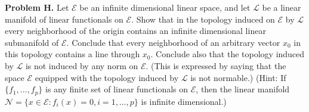 \textbf{Problem H.} Let $\mathcal{E}$ be an infinite dimensional linear space, and let $\mathcal{L}$ be a linear manifold of linear functionals on $\mathcal{E}$. Show that in the topology induced on $\mathcal{E}$ by $\mathcal{L}$ every neighborhood of the origin contains an infinite dimensional linear submanifold of $\mathcal{E}$. Conclude that every neighborhood of an arbitrary vector $x_0$ in this topology contains a line through $x_0$. Conclude also that the topology induced by $\mathcal{L}$ is not induced by any norm on $\mathcal{E}$. (This is expressed by saying that the space $\mathcal{E}$ equipped with the topology induced by $\mathcal{L}$ is not normable.) (Hint: If $\{f_1, \ldots, f_p\}$ is any finite set of linear functionals on $\mathcal{E}$, then the linear manifold $\mathcal{N} = \{x \in \mathcal{E}: f_i(x) = 0, i = 1, \ldots, p\}$ is infinite dimensional.)
